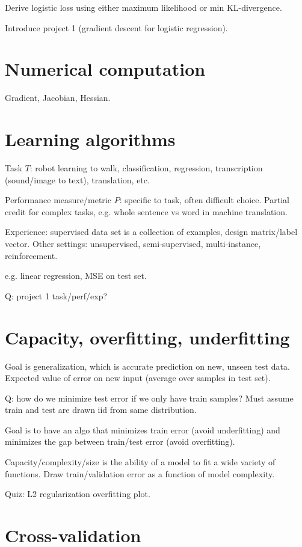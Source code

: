 \documentclass{article}
\begin{document}
Derive logistic loss using either maximum likelihood or min
KL-divergence.

Introduce project 1 (gradient descent for logistic regression).

\section{Numerical computation}

Gradient, Jacobian, Hessian.

\section{Learning algorithms}

Task $T$: robot learning to walk, classification, regression,
transcription (sound/image to text), translation, etc.

Performance measure/metric $P$: specific to task, often difficult
choice. Partial credit for complex tasks, e.g. whole sentence vs word
in machine translation.

Experience: supervised data set is a collection of examples, design matrix/label
vector. Other settings: unsupervised, semi-supervised, multi-instance,
reinforcement.

e.g. linear regression, MSE on test set.

Q: project 1 task/perf/exp?

\section{Capacity, overfitting, underfitting}

Goal is generalization, which is accurate prediction on new, unseen
test data. Expected value of error on new input (average over samples
in test set).

Q: how do we minimize test error if we only have train samples? Must
assume train and test are drawn iid from same distribution.

Goal is to have an algo that minimizes train error (avoid
underfitting) and minimizes the gap between train/test error (avoid
overfitting).

Capacity/complexity/size is the ability of a model to fit a wide
variety of functions. Draw train/validation error as a function of
model complexity.

Quiz: L2 regularization overfitting plot.

\section{Cross-validation}
\end{document}
